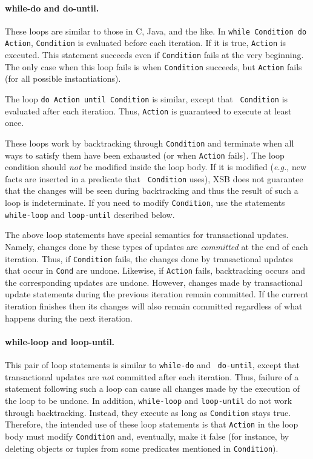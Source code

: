 \documentclass[11pt]{article}
\begin{document}
\paragraph{while-do and do-until.}
These loops are similar to those in C, Java, and the like.
In {\tt while Condition do Action}, {\tt Condition} is evaluated before each
iteration. If it is true, {\tt Action} is executed. This statement succeeds
even if {\tt Condition} fails at the very beginning. The only case when this
loop fails is when {\tt Condition} succeeds, but {\tt Action} fails (for all
possible instantiations).

The loop {\tt do Action until Condition} is similar, except that {\tt
  Condition} is evaluated after each iteration. Thus, {\tt Action} is
guaranteed to execute at least once.

These loops work by backtracking through {\tt Condition} and terminate when
all ways to satisfy them have been exhausted (or when {\tt Action} fails).
The loop condition should \emph{not} be modified inside the loop body.  If
it is modified ({\it e.g.}, new facts are inserted in a predicate that {\tt
  Condition} uses), XSB does not guarantee that the changes will be seen
during backtracking and thus the result of such a loop is indeterminate.
If you need to modify {\tt Condition}, use the statements {\tt while-loop}
and {\tt loop-until} described below.

The above loop statements have special semantics for transactional updates.
Namely, changes done by these types of updates are \emph{committed} at the
end of each iteration. Thus, if {\tt Condition} fails, the changes done by
transactional updates that occur in {\tt Cond} are undone. Likewise, if
{\tt Action} fails, backtracking occurs and the corresponding updates are
undone. However, changes made by transactional update statements during the
previous iteration remain committed. If the current iteration finishes then
its changes will also remain committed regardless of what happens during
the next iteration.


\paragraph{while-loop and loop-until.}
This pair of loop statements is similar to {\tt while-do} and {\tt
  do-until}, except that transactional updates are \emph{not} committed
after each iteration. Thus, failure of a statement following such a loop
can cause all changes made by the execution of the loop to be undone.  In
addition, {\tt while-loop} and {\tt loop-until} do not work through
backtracking. Instead, they execute as long as {\tt Condition} stays true.
Therefore, the intended use of these loop statements is that {\tt Action}
in the loop body must modify {\tt Condition} and, eventually, make it false
(for instance, by deleting objects or tuples from some predicates mentioned
in {\tt Condition}).
  
\end{document}
